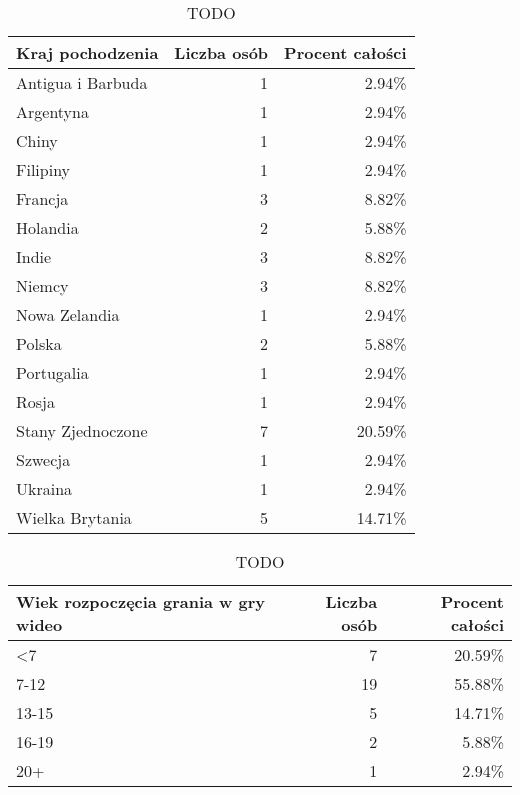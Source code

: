 \begin{table}[h!]
    \begin{center}
        \begin{tabular}{|l|r|r|}
            \hline
            Kraj pochodzenia             & Liczba osób & Procent całości \\
            \hline
            Antigua i Barbuda & 1 & 2.94\% \\
            Argentyna & 1 & 2.94\% \\
            Chiny & 1 & 2.94\% \\
            Filipiny & 1 & 2.94\% \\
            Francja & 3 & 8.82\% \\
            Holandia & 2 & 5.88\% \\
            Indie & 3 & 8.82\% \\
            Niemcy & 3 & 8.82\% \\
            Nowa Zelandia & 1 & 2.94\% \\
            Polska & 2 & 5.88\% \\
            Portugalia & 1 & 2.94\% \\
            Rosja & 1 & 2.94\% \\
            Stany Zjednoczone & 7 & 20.59\% \\
            Szwecja & 1 & 2.94\% \\
            Ukraina & 1 & 2.94\% \\
            Wielka Brytania & 5 & 14.71\% \\
            \hline
        \end{tabular}
    \end{center}
    \caption{TODO}\label{tab1:ch7_3}
\end{table}

\begin{table}[h!]
    \begin{center}
        \begin{tabular}{|l|r|r|}
            \hline
            Wiek rozpoczęcia grania w gry wideo & Liczba osób & Procent całości \\
            \hline
            <7 & 7 & 20.59\% \\
            7-12 & 19 & 55.88\% \\
            13-15 & 5 & 14.71\% \\
            16-19 & 2 & 5.88\% \\
            20+ & 1 & 2.94\% \\
            \hline
        \end{tabular}
    \end{center}
    \caption{TODO}\label{tab1:ch7_4}
\end{table}

